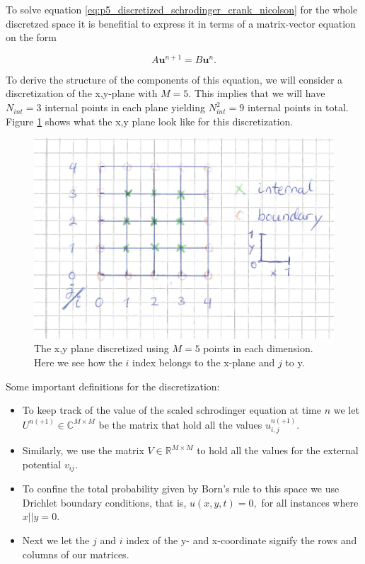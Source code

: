 \documentclass[../main_proj5.tex]{subfiles}
\begin{document}
\noindent To solve equation \eqref{eq:p5_discretized_schrodinger_crank_nicolson} for the whole discretzed space it is benefitial to express it in terms of a matrix-vector equation on the form 

\begin{equation}
    A \mathbf{u}^{n+1} = B    \mathbf{u}^{n} .
\end{equation}

\noindent To derive the structure of the components of this equation, we will consider a discretization of the x,y-plane with $M=5$. This implies that we will have $N_{int}=3$ internal points in each plane yielding $N_{int}^{2}=9$ internal points in total. Figure \ref{fig:p5_M5_discretized_xyplane} shows what the x,y plane look like for this discretization.

\begin{figure}[h!]
    \centering
    \includegraphics[width=0.6\linewidth]{Project 5/figures/discrtetization_xy.png}
    \caption{The x,y plane discretized using $M=5$ points in each dimension. Here we see how the $i$ index belongs to the x-plane and $j$ to y. }
    \label{fig:p5_M5_discretized_xyplane}
\end{figure}

\noindent Some important definitions for the discretization:

\begin{itemize}
    \item To keep track of the value of the scaled schrodinger equation at time $n$ we let $U^{n(+1)} \in \mathbb{C}^{M\times M}$ be the matrix that hold all the values $u_{i,j}^{n(+1)}$.
    \item Similarly, we use the matrix $V \in \mathbb{R}^{M \times M}$ to hold all the values for the external potential $v_{ij}$.
    \item To confine the total probability given by Born's rule to this space we use Drichlet boundary conditions, that is, $u(x,y,t) = 0,$ for all instances where $x || y = 0$.
    \item Next we let the $j$ and $i$ index of the y- and x-coordinate signify the rows and columns of our matrices. 
\end{itemize}   
\end{document}
